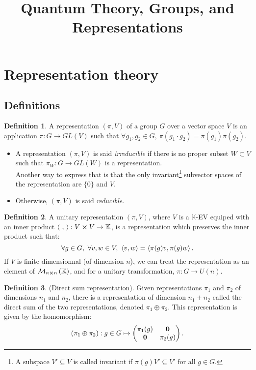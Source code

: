 \documentclass[11pt,a4paper]{article}
\title{Quantum Theory, Groups, and Representations}
\theoremstyle{definition}
\newtheorem{definition}{Definition}[section]
\numberwithin{equation}{section}
\begin{document}
\maketitle
\tableofcontents
\section{Representation theory}
\subsection{Definitions}
\begin{definition}
    A representation $\left(\pi,V\right)$ of a group $G$ over a vector space $V$ is an application $\pi:G\rightarrow GL(V)$ such that $\forall g_1,g_2 \in G, \ \pi\left(g_1\cdot g_2\right) = \pi\left(g_1\right) \pi(g_2)$.
    \begin{itemize}
        \item A representation $(\pi,V)$ is said \textit{irreducible} if there is no proper subset $W \subset  V$ such that $\pi_W:G\rightarrow GL(W)$ is a representation.\\
         Another way to express that is that the only invariant\footnote{A subspace $V'\subseteq V $ is called invariant if $\pi(g)V' \subseteq V'$ for all $g \in G$.} subvector spaces of the representation are $\{0\}$ and $V$.
        \item Otherwise, $(\pi,V)$ is said \textit{reducible}.
    \end{itemize}
\end{definition}
\begin{definition}
    A unitary representation $(\pi,V)$, where $V$ is a $\mathbb{K}$-EV equiped with an inner product $\expval{\ ,\ }:V\cross V \rightarrow \mathbb{K}$, is a representation which preserves the inner product such that:
    \begin{equation*}
        \forall g \in G,\ \forall v,w \in V,\ \expval{v,w} = \expval{\pi(g)v, \pi(g)w}. 
    \end{equation*}
    If $V$ is finite dimensionnal (of dimension $n$), we can treat the representation as an element of $\mathcal{M}_{n \cross n}\left(\mathbb{K}\right)$, and for a unitary transformation, $\pi : G \rightarrow U(n)$.
\end{definition}
\begin{definition}
    (Direct sum representation). Given representations $\pi_1$ and $\pi_2$ of dimensions $n_1$ and $n_2$, there is a representation of dimension $n_1+n_2$ called the direct sum of the two representations, denoted $\pi_1 \oplus \pi_2$. This representation is given by the homomorphism:
    \begin{equation*}
        \left(\pi_1 \oplus \pi_2\right):g \in G \mapsto \begin{pmatrix}
            \pi_1(g)& \vb{0}\\
            \vb{0}& \pi_2(g)
        \end{pmatrix}.
    \end{equation*}
\end{definition}
\end{document}
